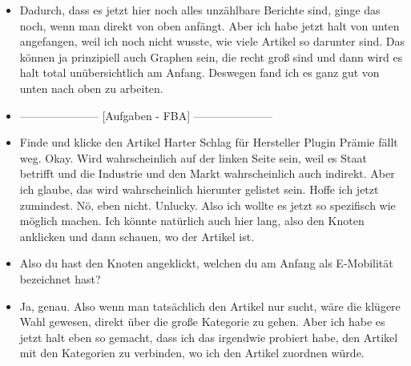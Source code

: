 {\begin{itemize}[]
    Wenn ich jetzt so drüber nachdenke, finde ich sogar die Ansicht mit den Kategorien wahrscheinlich doch besser, weil wenn halt alles dazu gelistet wird, was dazuzählt.
    Und dann hat man halt auch noch mal so eine Untergliederung in, ich sage mal in detailliertere Sachen halt. Also related Artikel sage ich jetzt einfach mal. 
    Ich glaube, das, was mich am Anfang so ein bisschen davon abgeschreckt hat, die Kategorien zu wählen ist erst mal die Graphen-Ansicht wahrscheinlich.
    Das wäre für mich intuitiver, wenn es wie bei einem File-Explorer wäre.
    Also man hat einen Ordner, der über einem Ordner steht und dann hat man Unterordner.
    Wenn es so gewesen wäre wette ich mit dir, dass ich vermutlich die Kategorien-Ansicht eher genutzt hätte.
    Aber ansonsten finde ich das ziemlich nice, dass man die Sachen, also die Kategorie anklicken kann und man hat alles gelistet bekommt.
    \item {} Dadurch, dass es jetzt hier noch alles unzählbare Berichte sind, ginge das noch, wenn man direkt von oben anfängt.
    Aber ich habe jetzt halt von unten angefangen, weil ich noch nicht wusste, wie viele Artikel so darunter sind.
    Das können ja prinzipiell auch Graphen sein, die recht groß sind und dann wird es halt total unübersichtlich am Anfang.
    Deswegen fand ich es ganz gut von unten nach oben zu arbeiten.
    \item {---------------------} [Aufgaben - FBA] {---------------------}
    \item {} Finde und klicke den Artikel \flqq Harter Schlag für Hersteller Plugin Prämie fällt weg\frqq{}.
    Okay. Wird wahrscheinlich auf der linken Seite sein, weil es Staat betrifft und die Industrie und den Markt wahrscheinlich auch indirekt.
    Aber ich glaube, das wird wahrscheinlich hierunter gelistet sein.
    Hoffe ich jetzt zumindest.
    Nö, eben nicht.
    Unlucky.
    Also ich wollte es jetzt so spezifisch wie möglich machen.
    Ich könnte natürlich auch hier lang, also den Knoten anklicken und dann schauen, wo der Artikel ist.
    \item {} Also du hast den Knoten angeklickt, welchen du am Anfang als E-Mobilität bezeichnet hast?
    \item {} Ja, genau.
    Also wenn man tatsächlich den Artikel nur sucht, wäre die klügere Wahl gewesen, direkt über die große Kategorie zu gehen.
    Aber ich habe es jetzt halt eben so gemacht, dass ich das irgendwie probiert habe, den Artikel mit den Kategorien zu verbinden, wo ich den Artikel zuordnen würde.

\end{itemize}}
